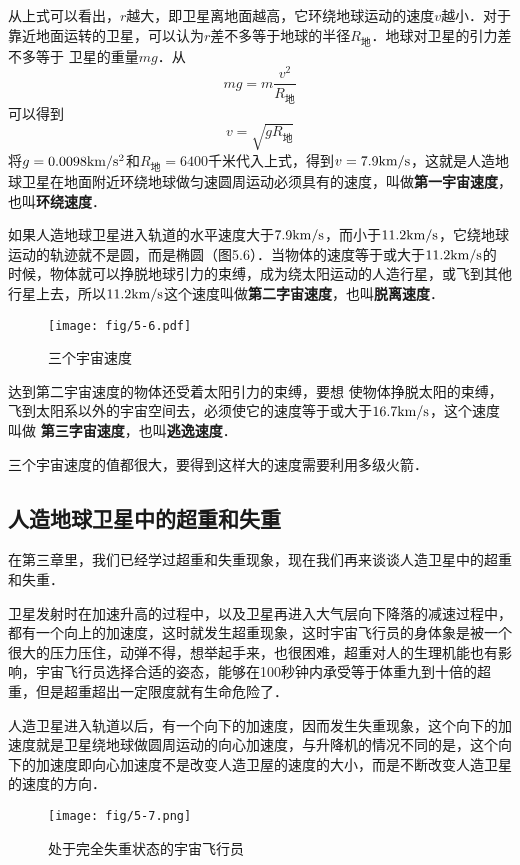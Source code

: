 从上式可以看出，$r$越大，即卫星离地面越高，它环绕地球运动的速度$v$越小．对于靠近地面运转的卫星，可以认为$r$差不多等于地球的半径$R_{\text{地}}$．地球对卫星的引力差不多等于
卫星的重量$mg$．从
\[mg=m\frac{v^2}{R_{\text{地}}} \]
可以得到
\[v=\sqrt{gR_{\text{地}}}\]
将$g=0.0098{\rm km}/{\rm s^2}$和$R_{\text{地}}=6400$千米代入上式，得到$v=7.9{\rm km}/{\rm s}$，这就是人造地球卫星在地面附近环绕地球做匀速圆周运动必须具有的速度，叫做\textbf{第一宇宙速度}，也叫\textbf{环绕速度}．

如果人造地球卫星进入轨道的水平速度大于$7.9{\rm km}/{\rm s}$，而小于$11.2{\rm km}/{\rm s}$，它绕地球运动的轨迹就不是圆，而是椭圆（图5.6）．当物体的速度等于或大于$11.2{\rm km}/{\rm s}$的
时候，物体就可以挣脱地球引力的束缚，成为绕太阳运动的人造行星，或飞到其他行星上去，所以$11.2{\rm km}/{\rm s}$这个速度叫做\textbf{第二字宙速度}，也叫\textbf{脱离速度}．
\begin{figure}\centering
\texttt{[image: fig/5-6.pdf]}
\caption{三个宇宙速度}
\end{figure}

达到第二宇宙速度的物体还受着太阳引力的束缚，要想
使物体挣脱太阳的束缚，飞到太阳系以外的宇宙空间去，必须使它的速度等于或大于$16.7{\rm km}/{\rm s}$，这个速度叫做 \textbf{第三字宙速度}，也叫\textbf{逃逸速度}．

三个宇宙速度的值都很大，要得到这样大的速度需要利用多级火箭．

\subsection{人造地球卫星中的超重和失重}

在第三章里，我们已经学过超重和失重现象，现在我们再来谈谈人造卫星中的超重和失重．

卫星发射时在加速升高的过程中，以及卫星再进入大气层向下降落的减速过程中，都有一个向上的加速度，这时就发生超重现象，这时宇宙飞行员的身体象是被一个很大的压力压住，动弹不得，想举起手来，也很困难，超重对人的生理机能也有影响，宇宙飞行员选择合适的姿态，能够在100秒钟内承受等于体重九到十倍的超重，但是超重超出一定限度就有生命危险了．

人造卫星进入轨道以后，有一个向下的加速度，因而发生失重现象，这个向下的加速度就是卫星绕地球做圆周运动的向心加速度，与升降机的情况不同的是，这个向下的加速度即向心加速度不是改变人造卫屋的速度的大小，而是不断改变人造卫星的速度的方向．

\begin{figure}[htp]
\centering\texttt{[image: fig/5-7.png]}
\caption{处于完全失重状态的宇宙飞行员}
\end{figure}

